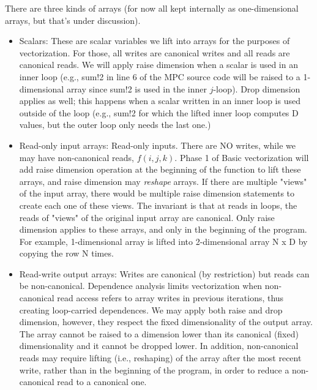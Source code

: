 There are three kinds of arrays (for now all kept internally as one-dimensional arrays, but that's under discussion).
\begin{itemize}

\item Scalars: These are scalar variables we lift into arrays for the purposes of vectorization.
For those, all writes are canonical writes and all reads are canonical reads. We will apply raise dimension when
a scalar is used in an inner loop (e.g., {\sf sum!2} in line 6 of the MPC source code will be raised to a 1-dimensional
array since {\sf sum!2} is used in the inner $j$-loop). Drop dimension applies as well; this happens when a scalar
written in an inner loop is used outside of the loop (e.g., {\sf sum!2} for which the lifted inner loop computes
{\sf D} values, but the outer loop only needs the last one.)

\item Read-only input arrays: Read-only inputs. There are NO writes, while we may have non-canonical reads, $f(i,j,k)$.
Phase 1 of Basic vectorization will add raise dimension operation at the beginning of the function to lift these arrays,
and raise dimension may \emph{reshape} arrays. If there are multiple "views" of the input array, there would be multiple raise dimension statements to create
each one of these views. The invariant is that at reads in loops, the reads of "views" of the original input array are canonical.
Only raise dimension applies to these arrays, and only in the beginning of the program. For example, 1-dimensional array
 is lifted into 2-dimensional array {\sf N x D} by copying the row {\sf N} times.

 \item Read-write output arrays: Writes are canonical (by restriction) but reads can be non-canonical.
 Dependence analysis limits vectorization when non-canonical read access refers to array writes in
 previous iterations, thus creating loop-carried dependences. We may apply both raise and drop dimension, however,
 they respect the fixed dimensionality of the output array. The array cannot be raised to a dimension lower than
 its canonical (fixed) dimensionality and it cannot be dropped lower. In addition, non-canonical reads may
 require lifting (i.e., reshaping) of the array after the most recent write, rather than in the beginning of the program,
 in order to reduce a non-canonical read to a canonical one.

\end{itemize}

